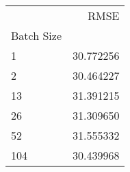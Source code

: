 \begin{tabular}{lr}
 & RMSE \\
Batch Size &  \\
1 & 30.772256 \\
2 & 30.464227 \\
13 & 31.391215 \\
26 & 31.309650 \\
52 & 31.555332 \\
104 & 30.439968 \\
\end{tabular}
